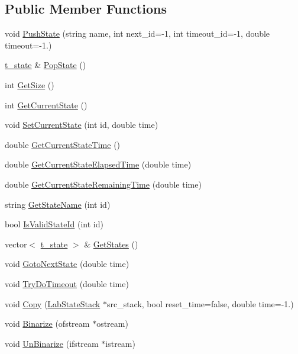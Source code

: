\subsection*{Public Member Functions}
\begin{DoxyCompactItemize}
\item 
void \hyperlink{classelps_1_1_lab_state_stack_a5d2279b5bf25fd3e3628c6d35f94b7e3}{Push\+State} (string name, int next\+\_\+id=-\/1, int timeout\+\_\+id=-\/1, double timeout=-\/1.)
\item 
\hyperlink{structelps_1_1_lab_state_stack_1_1t__state}{t\+\_\+state} \& \hyperlink{classelps_1_1_lab_state_stack_a963d0865077fd3c774ec2de9f96a2933}{Pop\+State} ()
\item 
int \hyperlink{classelps_1_1_lab_state_stack_af54751d425f8779b89f905ab1bfce13d}{Get\+Size} ()
\item 
int \hyperlink{classelps_1_1_lab_state_stack_a857002d5549e55eda7ea37dd704ae614}{Get\+Current\+State} ()
\item 
void \hyperlink{classelps_1_1_lab_state_stack_a561bf5cbe60e344444b78707edcbd284}{Set\+Current\+State} (int id, double time)
\item 
double \hyperlink{classelps_1_1_lab_state_stack_ad7102dad5ee2a8dec34f46e8e680e14d}{Get\+Current\+State\+Time} ()
\item 
double \hyperlink{classelps_1_1_lab_state_stack_a37d32957231e658b75ae1ffedac5223d}{Get\+Current\+State\+Elapsed\+Time} (double time)
\item 
double \hyperlink{classelps_1_1_lab_state_stack_a3f69ff973ca80d870b5102fbd2e9858c}{Get\+Current\+State\+Remaining\+Time} (double time)
\item 
string \hyperlink{classelps_1_1_lab_state_stack_aa1a05817e648054092b5ff98a3ccf67a}{Get\+State\+Name} (int id)
\item 
bool \hyperlink{classelps_1_1_lab_state_stack_a69f92a113f9dd75c99d34b03221a2465}{Is\+Valid\+State\+Id} (int id)
\item 
vector$<$ \hyperlink{structelps_1_1_lab_state_stack_1_1t__state}{t\+\_\+state} $>$ \& \hyperlink{classelps_1_1_lab_state_stack_ad7523516f10a972371967a1454facc52}{Get\+States} ()
\item 
void \hyperlink{classelps_1_1_lab_state_stack_a908bdb7c1aaf4b6daa7ba5bebc6ebf8b}{Goto\+Next\+State} (double time)
\item 
void \hyperlink{classelps_1_1_lab_state_stack_aef1a38c4d79b29448e7c89886b1c01ac}{Try\+Do\+Timeout} (double time)
\item 
void \hyperlink{classelps_1_1_lab_state_stack_ad4901f762e20f67361fb9ec528f50430}{Copy} (\hyperlink{classelps_1_1_lab_state_stack}{Lab\+State\+Stack} $\ast$src\+\_\+stack, bool reset\+\_\+time=false, double time=-\/1.)
\item 
void \hyperlink{classelps_1_1_lab_state_stack_a3cd8dd04feef1244f6cacb6408a1b56e}{Binarize} (ofstream $\ast$ostream)
\item 
void \hyperlink{classelps_1_1_lab_state_stack_a2e449395adca12f1030338d931ff902a}{Un\+Binarize} (ifstream $\ast$istream)
\end{DoxyCompactItemize}



